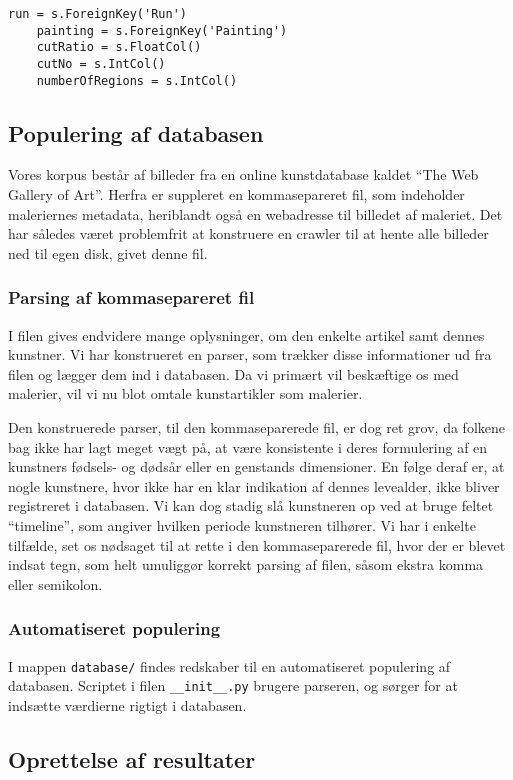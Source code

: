 {\begin{lstlisting}[caption={Pythonkode for oprettelse af \emph{foreign
    keys} i databasen.}, captionpos=b, label={code_tabel_result}, frame=tb,
    breaklines=false, float=h]
    run = s.ForeignKey('Run')
    painting = s.ForeignKey('Painting')
    cutRatio = s.FloatCol()
    cutNo = s.IntCol()
    numberOfRegions = s.IntCol()
\end{lstlisting}

\subsection{Populering af databasen}
Vores korpus består af billeder fra en online kunstdatabase kaldet
``The Web Gallery of Art''\cite{wgahu}. Herfra er suppleret en
kommasepareret fil, som indeholder maleriernes metadata, heriblandt også
en webadresse til billedet af maleriet. Det har således været
problemfrit at konstruere en crawler til at hente alle billeder ned til
egen disk, givet denne fil.

\subsubsection{Parsing af kommasepareret fil}
I filen gives endvidere mange oplysninger, om den enkelte artikel samt
dennes kunstner.  Vi har konstrueret en parser, som trækker disse
informationer ud fra filen og lægger dem ind i databasen. Da vi primært
vil beskæftige os med malerier, vil vi nu blot omtale kunstartikler som
malerier.

Den konstruerede parser, til den kommaseparerede fil, er dog ret grov,
da folkene bag \cite{wgahu} ikke har lagt meget vægt på, at være
konsistente i deres formulering af en kunstners fødsels- og dødsår eller
en genstands dimensioner. En følge deraf er, at nogle kunstnere, hvor
\cite{wgahu} ikke har en klar indikation af dennes levealder, ikke
bliver registreret i databasen. Vi kan dog stadig slå kunstneren op ved
at bruge feltet ``timeline'', som angiver hvilken periode kunstneren
tilhører. Vi har i enkelte tilfælde, set os nødsaget til at rette i den
kommaseparerede fil, hvor der er blevet indsat tegn, som helt umuliggør
korrekt parsing af filen, såsom ekstra komma eller semikolon.

\subsubsection{Automatiseret populering}
I mappen \texttt{database/} findes redskaber til en automatiseret
populering af databasen. Scriptet i filen \texttt{\_\_init\_\_.py}
brugere parseren, og sørger for at indsætte værdierne rigtigt i
databasen.

\subsection{Oprettelse af resultater}
}
